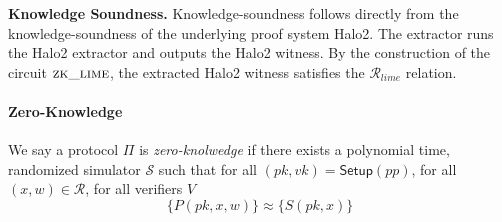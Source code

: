 \begin{proofs}
\textbf{Knowledge Soundness.} Knowledge-soundness follows directly from the knowledge-soundness of the underlying proof system Halo2. The extractor runs the Halo2 extractor and outputs the Halo2 witness. By the construction of the circuit $\textsc{zk\_lime}$, the extracted Halo2 witness satisfies the $\mathcal{R}_{lime}$ relation.
\end{proofs}

\paragraph{Zero-Knowledge}

We say a protocol $\Pi$ is \textit{zero-knolwedge} if there exists a polynomial time, randomized simulator $\mathcal{S}$ such that for all $(pk, vk) = \textsf{Setup}(pp)$, for all $(x, w) \in \mathcal{R}$, for all verifiers $V$
\[
    \{ P(pk, x, w) \} \approx \{ S(pk, x) \}
\]




